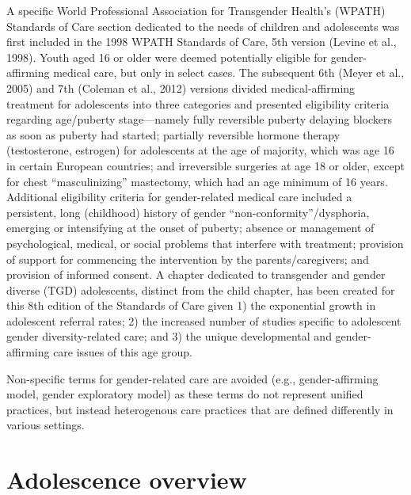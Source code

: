 \documentclass[
]{book}
\begin{document}
A specific World Professional Association for
Transgender Health's (WPATH) Standards of Care
section dedicated to the needs of children and
adolescents was first included in the 1998 WPATH
Standards of Care, 5th version (Levine et al.,
1998). Youth aged 16 or older were deemed
potentially eligible for gender-affirming medical
care, but only in select cases. The subsequent 6th
(Meyer et al., 2005) and 7th (Coleman et al.,
2012) versions divided medical-affirming treatment for adolescents into three categories and
presented eligibility criteria regarding age/puberty
stage---namely fully reversible puberty delaying
blockers as soon as puberty had started; partially
reversible hormone therapy (testosterone, estrogen) for adolescents at the age of majority, which
was age 16 in certain European countries; and
irreversible surgeries at age 18 or older, except
for chest ``masculinizing'' mastectomy, which had
an age minimum of 16 years. Additional eligibility criteria for gender-related medical care
included a persistent, long (childhood) history of
gender ``non-conformity''/dysphoria, emerging or
intensifying at the onset of puberty; absence or
management of psychological, medical, or social
problems that interfere with treatment; provision
of support for commencing the intervention by
the parents/caregivers; and provision of informed
consent. A chapter dedicated to transgender and
gender diverse (TGD) adolescents, distinct from
the child chapter, has been created for this 8th
edition of the Standards of Care given 1) the
exponential growth in adolescent referral rates;
2) the increased number of studies specific to
adolescent gender diversity-related care; and 3)
the unique developmental and gender-affirming
care issues of this age group.

Non-specific terms for gender-related care are
avoided (e.g., gender-affirming model, gender
exploratory model) as these terms do not represent unified practices, but instead heterogenous
care practices that are defined differently in various settings.

\hypertarget{adolescence-overview}{%
\section*{Adolescence overview}\label{adolescence-overview}}
\end{document}
